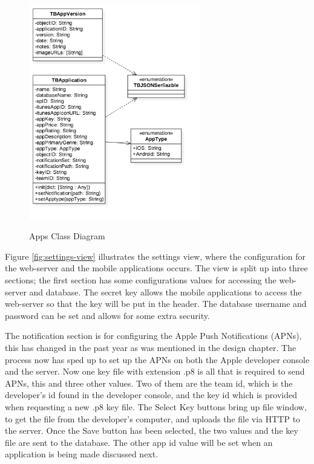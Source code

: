 \begin{figure}[!h]
    \caption{Apps Class Diagram}
    \centering
    \includegraphics[width=75mm]{images/classdiagrams/Settings}
    \label{fig:settings-cd}
\end{figure} 

Figure \ref{fig:settings-view} illustrates the settings view, where the configuration for the web-server and the mobile applications occurs. The view is split up into three sections; the first section has some configurations values for accessing the web-server and database. The secret key allows the mobile applications to access the web-server so that the key will be put in the header. The database username and password can be set and allows for some extra security.

The notification section is for configuring the Apple Push Notifications (APNs), this has changed in the past year as was mentioned in the design chapter. The process now has sped up to set up the APNs on both the Apple developer console and the server. Now one key file with extension .p8 is all that is required to send APNs, this and three other values. Two of them are the team id, which is the developer's id found in the developer console, and the key id which is provided when requesting a new .p8 key file. The Select Key buttons bring up file window, to get the file from the developer's computer, and uploads the file via HTTP to the server. Once the Save button has been selected, the two values and the key file are sent to the database. The other app id value will be set when an application is being made discussed next.

